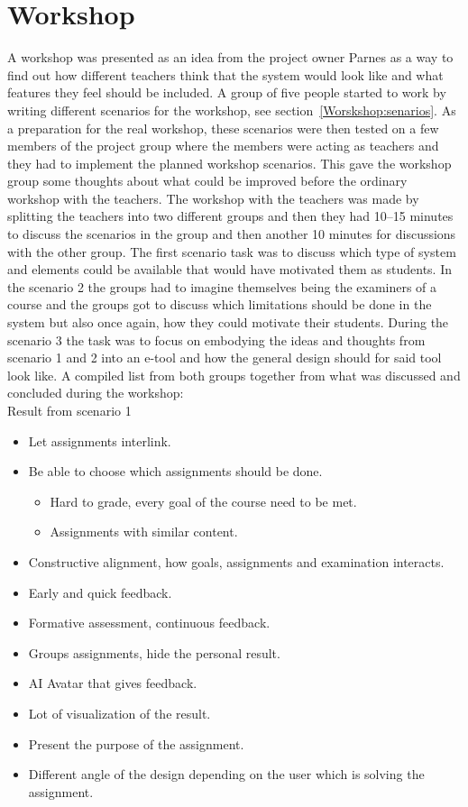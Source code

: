 \section{Workshop} 
A workshop was presented as an idea from the project owner Parnes as a way to find out how different teachers think that the system would look like and what features they feel should be included. A group of five people started to work by writing different scenarios for the workshop, see section~\ref{Worskshop:senarios}. As a preparation for the real workshop, these scenarios were then tested on a few members of the project group where the members were acting as teachers and they had to implement the planned workshop scenarios. This gave the workshop group some thoughts about what could be improved before the ordinary workshop with the teachers. 
The workshop with the teachers was made by splitting the teachers into two different groups and then they had 10--15 minutes to discuss the scenarios in the group and then another 10 minutes for discussions with the other group. 
The first scenario task was to discuss which type of system and elements could be available that would have motivated them as students. In the scenario 2 the groups had to imagine themselves being the examiners of a course and the groups got to discuss which limitations should be done in the system but also once again, how they could motivate their students. During the scenario 3 the task was to focus on embodying the ideas and thoughts from scenario 1 and 2 into an e-tool and how the general design should for said tool look like. A compiled list from both groups together from what was discussed and concluded during the workshop:
\\
Result from scenario 1
\begin{itemize}
\item Let assignments interlink.
\item Be able to choose which assignments should be done.
    \begin{itemize}
    \item Hard to grade, every goal of the course need to be met.
    \item Assignments with similar content.
    \end{itemize}
\item Constructive alignment, how goals, assignments and examination interacts.
\item Early and quick feedback.
\item Formative assessment, continuous feedback.
\item Groups assignments, hide the personal result.
\item AI Avatar that gives feedback.
\item Lot of visualization of the result.
\item Present the purpose of the assignment.
\item Different angle of the design depending on the user which is solving the assignment.
\end{itemize}


